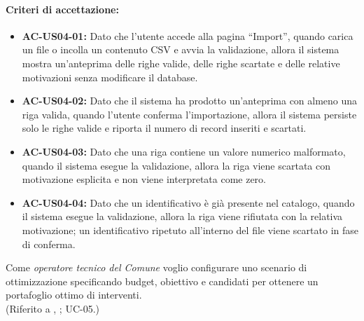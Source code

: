 \paragraph{Criteri di accettazione:}
\begin{itemize}[leftmargin=1.4em]
    \item \textbf{AC-US04-01:} Dato che l'utente accede alla pagina ``Import'', quando carica un file o incolla un contenuto CSV e avvia la validazione, allora il sistema mostra un'anteprima delle righe valide, delle righe scartate e delle relative motivazioni senza modificare il database.
    \item \textbf{AC-US04-02:} Dato che il sistema ha prodotto un'anteprima con almeno una riga valida, quando l'utente conferma l'importazione, allora il sistema persiste solo le righe valide e riporta il numero di record inseriti e scartati.
    \item \textbf{AC-US04-03:} Dato che una riga contiene un valore numerico malformato, quando il sistema esegue la validazione, allora la riga viene scartata con motivazione esplicita e non viene interpretata come zero.
    \item \textbf{AC-US04-04:} Dato che un identificativo è già presente nel catalogo, quando il sistema esegue la validazione, allora la riga viene rifiutata con la relativa motivazione; un identificativo ripetuto all'interno del file viene scartato in fase di conferma.
\end{itemize}

 \label{us:scenario}
Come \textit{operatore tecnico del Comune} voglio configurare uno scenario di ottimizzazione specificando budget, obiettivo e candidati per ottenere un portafoglio ottimo di interventi. \\ (Riferito a , ; UC-05.)

